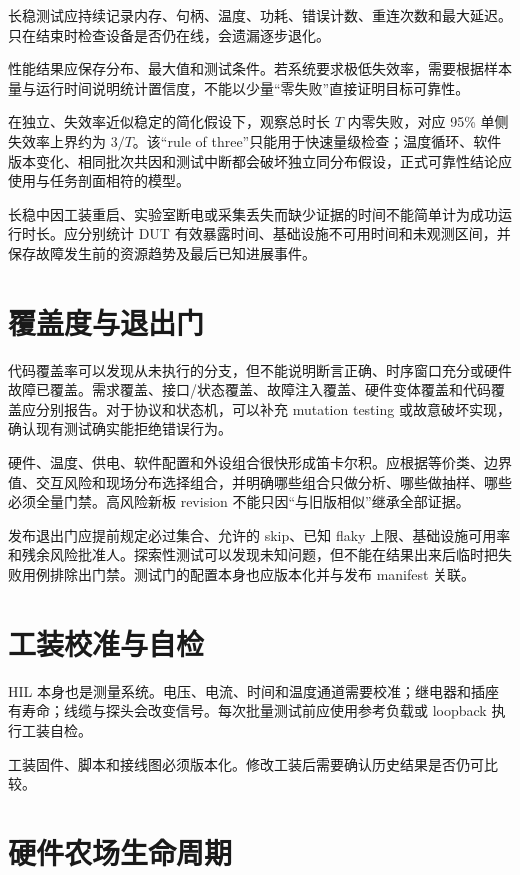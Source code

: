 长稳测试应持续记录内存、句柄、温度、功耗、错误计数、重连次数和最大延迟。只在结束时检查设备是否仍在线，会遗漏逐步退化。

性能结果应保存分布、最大值和测试条件。若系统要求极低失效率，需要根据样本量与运行时间说明统计置信度，不能以少量“零失败”直接证明目标可靠性。

在独立、失效率近似稳定的简化假设下，观察总时长 $T$ 内零失败，对应 95\% 单侧失效率上界约为 $3/T$。该“rule of three”只能用于快速量级检查；温度循环、软件版本变化、相同批次共因和测试中断都会破坏独立同分布假设，正式可靠性结论应使用与任务剖面相符的模型。

长稳中因工装重启、实验室断电或采集丢失而缺少证据的时间不能简单计为成功运行时长。应分别统计 DUT 有效暴露时间、基础设施不可用时间和未观测区间，并保存故障发生前的资源趋势及最后已知进展事件。

\section{覆盖度与退出门}

代码覆盖率可以发现从未执行的分支，但不能说明断言正确、时序窗口充分或硬件故障已覆盖。需求覆盖、接口/状态覆盖、故障注入覆盖、硬件变体覆盖和代码覆盖应分别报告。对于协议和状态机，可以补充 mutation testing 或故意破坏实现，确认现有测试确实能拒绝错误行为。

硬件、温度、供电、软件配置和外设组合很快形成笛卡尔积。应根据等价类、边界值、交互风险和现场分布选择组合，并明确哪些组合只做分析、哪些做抽样、哪些必须全量门禁。高风险新板 revision 不能只因“与旧版相似”继承全部证据。

发布退出门应提前规定必过集合、允许的 skip、已知 flaky 上限、基础设施可用率和残余风险批准人。探索性测试可以发现未知问题，但不能在结果出来后临时把失败用例排除出门禁。测试门的配置本身也应版本化并与发布 manifest 关联。

\section{工装校准与自检}

HIL 本身也是测量系统。电压、电流、时间和温度通道需要校准；继电器和插座有寿命；线缆与探头会改变信号。每次批量测试前应使用参考负载或 loopback 执行工装自检。

工装固件、脚本和接线图必须版本化。修改工装后需要确认历史结果是否仍可比较。

\section{硬件农场生命周期}


